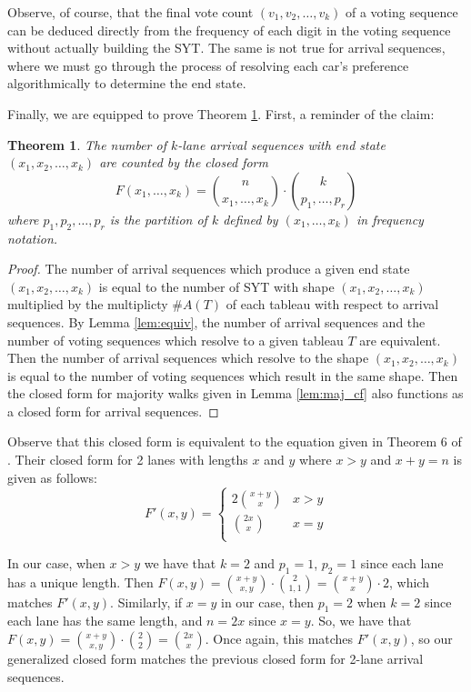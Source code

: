 \documentclass[article]{amsart}
\theoremstyle{plain}
\newtheorem{theorem}{Theorem}
\theoremstyle{definition}
\begin{document}
Observe, of course, that the final vote count $(v_1, v_2, \dots, v_k)$ of a voting sequence can be deduced directly from the frequency of each digit in the voting sequence without actually building the SYT. The same is not true for arrival sequences, where we must go through the process of resolving each car's preference algorithmically to determine the end state. 

Finally, we are equipped to prove Theorem \ref{thm:arr_cf}. First, a reminder of the claim:

\begin{theorem}\label{thm:arr_cf}
The number of $k$-lane arrival sequences with end state $(x_1, x_2, \dots, x_k)$ are counted by the closed form
\[ F(x_1, \dots, x_k) = \binom{n}{x_1, \dots, x_k} \cdot \binom{k}{p_1, \dots, p_r} \]
where $p_1, p_2, \dots, p_r$ is the partition of $k$ defined by $(x_1, \dots, x_k)$ in frequency notation.
\end{theorem}

\begin{proof}
    The number of arrival sequences which produce a given end state $(x_1, x_2, \dots, x_k)$ is equal to the number of SYT with shape $(x_1, x_2, \dots, x_k)$ multiplied by the multiplicty $\#A(T)$ of each tableau with respect to arrival sequences. By Lemma \ref{lem:equiv}, the number of arrival sequences and the number of voting sequences which resolve to a given tableau $T$ are equivalent. Then the number of arrival sequences which resolve to the shape $(x_1, x_2, \dots, x_k)$ is equal to the number of voting sequences which result in the same shape. Then the closed form for majority walks given in Lemma \ref{lem:maj_cf} also functions as a closed form for arrival sequences. 
\end{proof}

Observe that this closed form is equivalent to the equation given in Theorem 6 of \cite{bard}. Their closed form for 2 lanes with lengths $x$ and $y$ where $x > y$ and $x + y = n$ is given as follows:
$$
F'(x,y) = \begin{cases}
    \displaystyle 2 \binom{x+y}{x} & x > y \\ 
    \displaystyle \binom{2x}{x} & x = y \\
\end{cases}
$$

In our case, when $x > y$ we have that $k=2$ and $p_1 = 1$, $p_2 = 1$ since each lane has a unique length. Then $F(x,y) = \binom{x+y}{x,y} \cdot \binom{2}{1,1} = \binom{x+y}{x} \cdot 2$, which matches $F'(x,y)$. Similarly, if $x =y$ in our case, then $p_1 = 2$ when $k = 2$ since each lane has the same length, and $n = 2x$ since $x = y$. So, we have that $F(x,y) = \binom{x+y}{x,y} \cdot \binom{2}{2} = \binom{2x}{x}$. Once again, this matches $F'(x,y)$, so our generalized closed form matches the previous closed form for 2-lane arrival sequences.
\end{document}
